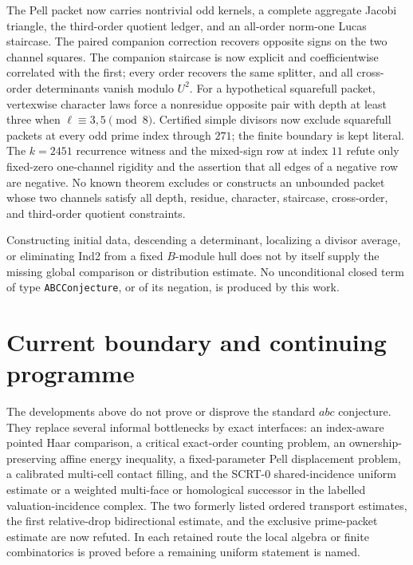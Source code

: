 \documentclass[11pt]{amsart}
\theoremstyle{definition}
\theoremstyle{remark}
\begin{document}
The Pell packet now carries nontrivial odd kernels, a complete aggregate
Jacobi triangle, the third-order quotient ledger, and an all-order norm-one
Lucas staircase.  The paired companion correction recovers opposite signs on
the two channel squares.  The companion staircase is now explicit and
coefficientwise correlated with the first; every order recovers the same
splitter, and all cross-order determinants vanish modulo $U^2$.  For a
hypothetical squarefull packet, vertexwise character laws force a nonresidue
opposite pair with depth at least three when $\ell\equiv3,5\pmod8$.
Certified simple divisors now exclude squarefull packets at every odd prime
index through $271$; the finite boundary is kept literal.  The $k=2451$
recurrence witness and the mixed-sign row at index $11$ refute only fixed-zero
one-channel rigidity and the assertion that all edges of a negative row are
negative.  No known theorem excludes or constructs an unbounded packet whose
two channels satisfy all depth, residue, character, staircase, cross-order,
and third-order quotient constraints.

Constructing initial data, descending a determinant, localizing a divisor
average, or eliminating Ind2 from a fixed $B$-module hull does not by itself
supply the missing global comparison or distribution estimate.
No unconditional closed term
of type \texttt{ABCConjecture}, or of its negation, is produced by this work.

\section{Current boundary and continuing programme}

The developments above do not prove or disprove the standard $abc$
conjecture.  They replace several informal bottlenecks by exact interfaces:
an index-aware pointed Haar comparison, a critical exact-order counting
problem, an ownership-preserving affine energy inequality, a fixed-parameter
Pell displacement problem, a calibrated multi-cell contact filling, and the
SCRT-0 shared-incidence uniform estimate or a weighted multi-face or
homological successor in the labelled valuation-incidence complex.  The two formerly listed ordered
transport estimates, the first relative-drop bidirectional estimate, and the
exclusive prime-packet estimate are now refuted.  In each retained route the local
algebra or finite combinatorics is proved before a remaining uniform statement
is named.
\end{document}
